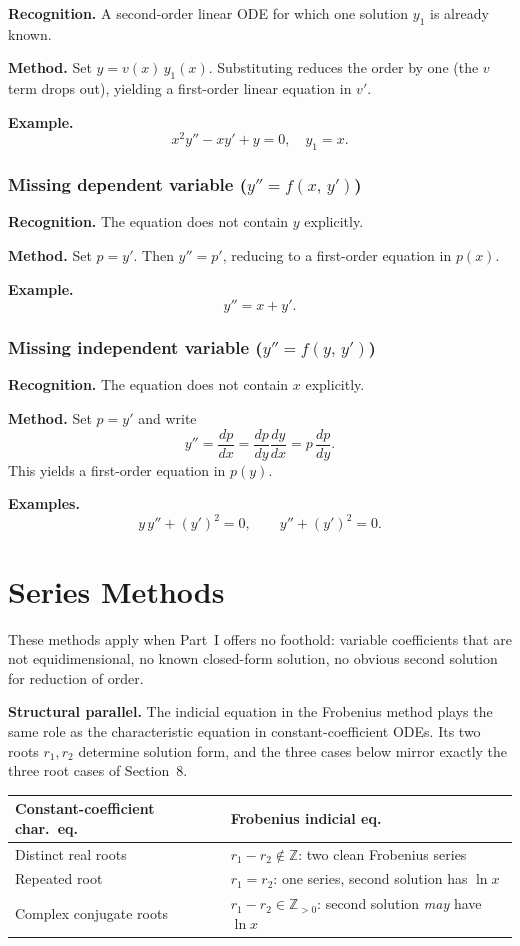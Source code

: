 \documentclass{essay}
\begin{document}
\textbf{Recognition.}  A second-order linear ODE for which one solution $y_1$ is already known.

\textbf{Method.}  Set $y = v(x)\,y_1(x)$.  Substituting reduces the order by one (the $v$ term drops out), yielding a first-order linear equation in $v'$.

\textbf{Example.}
\[
  x^2 y'' - xy' + y = 0, \quad y_1 = x.
\]

\section{Missing dependent variable ($y'' = f(x,\, y')$)}

\textbf{Recognition.}  The equation does not contain $y$ explicitly.

\textbf{Method.}  Set $p = y'$.  Then $y'' = p'$, reducing to a first-order equation in $p(x)$.

\textbf{Example.}
\[
  y'' = x + y'.
\]

\section{Missing independent variable ($y'' = f(y,\, y')$)}

\textbf{Recognition.}  The equation does not contain $x$ explicitly.

\textbf{Method.}  Set $p = y'$ and write
\[
  y'' = \frac{dp}{dx} = \frac{dp}{dy}\frac{dy}{dx} = p\,\frac{dp}{dy}.
\]
This yields a first-order equation in $p(y)$.

\textbf{Examples.}
\[
  y\,y'' + (y')^2 = 0, \qquad y'' + (y')^2 = 0.
\]

\part{Series Methods}

These methods apply when Part~I offers no foothold: variable coefficients that are not equidimensional, no known closed-form solution, no obvious second solution for reduction of order.

\medskip
\noindent\textbf{Structural parallel.}  The indicial equation in the Frobenius method plays the same role as the characteristic equation in constant-coefficient ODEs.  Its two roots $r_1, r_2$ determine solution form, and the three cases below mirror exactly the three root cases of Section~8.

\begin{center}
\renewcommand{\arraystretch}{1.4}
\begin{tabular}{ll}
\toprule
\textbf{Constant-coefficient char.\ eq.} & \textbf{Frobenius indicial eq.} \\
\midrule
Distinct real roots & $r_1 - r_2 \notin \mathbb{Z}$: two clean Frobenius series \\
Repeated root & $r_1 = r_2$: one series, second solution has $\ln x$ \\
Complex conjugate roots & $r_1 - r_2 \in \mathbb{Z}_{>0}$: second solution \emph{may} have $\ln x$ \\
\bottomrule
\end{tabular}
\end{center}
\end{document}
